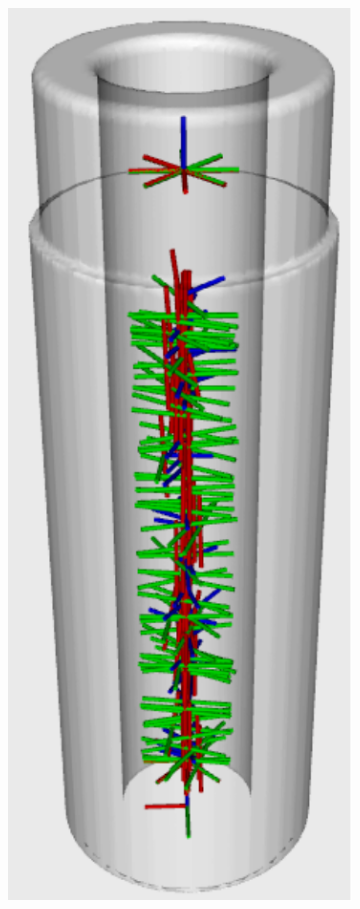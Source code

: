 \begin{figure}[h!]
{\begin{tcolorbox}
\begin{subfigure}[c]{.32\textwidth}
          \caption{}
          \label{fig:bearing_holder_candidates}
      \end{subfigure}
      \hfill
      \begin{subfigure}[c]{.125\textwidth}
          \centering
          \includegraphics[trim={0cm 0cm 0cm 0cm},clip,width=1\linewidth,angle=0]{Cap5/Figuras/candidates_plot/rod_candidates.pdf}

\end{subfigure}
\end{tcolorbox}}
\end{figure}
